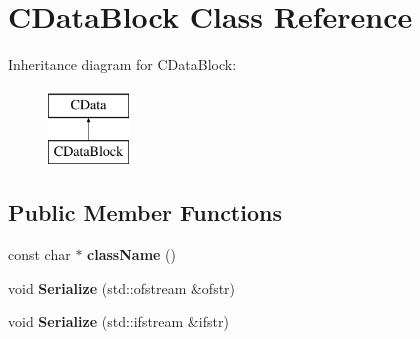 \hypertarget{classCDataBlock}{\section{C\-Data\-Block Class Reference}
\label{classCDataBlock}
}
Inheritance diagram for C\-Data\-Block\-:\begin{figure}[H]
\begin{center}
\leavevmode
\includegraphics[height=2.000000cm]{classCDataBlock}
\end{center}
\end{figure}
\subsection*{Public Member Functions}
\begin{DoxyCompactItemize}
\item 
\hypertarget{classCDataBlock_aa7b1268b05b49d165659449d0fbd104c}{const char $\ast$ {\bfseries class\-Name} ()}\label{classCDataBlock_aa7b1268b05b49d165659449d0fbd104c}

\item 
\hypertarget{classCDataBlock_a5253968ac55c78f3b5d03009cfa2b212}{void {\bfseries Serialize} (std\-::ofstream \&ofstr)}\label{classCDataBlock_a5253968ac55c78f3b5d03009cfa2b212}

\item 
\hypertarget{classCDataBlock_a57e5ec386c3b53cf07a1ef390344b341}{void {\bfseries Serialize} (std\-::ifstream \&ifstr)}\label{classCDataBlock_a57e5ec386c3b53cf07a1ef390344b341}

\end{DoxyCompactItemize}
